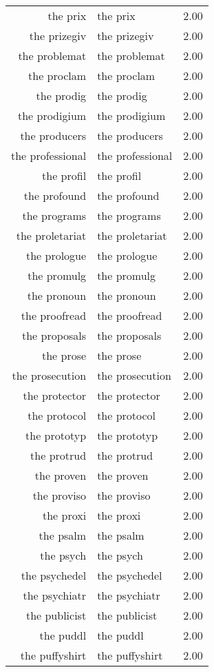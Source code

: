 \begin{table}[ht]
\begin{tabular}{rlr}
  the prix & the prix & 2.00 \\ 
  the prizegiv & the prizegiv & 2.00 \\ 
  the problemat & the problemat & 2.00 \\ 
  the proclam & the proclam & 2.00 \\ 
  the prodig & the prodig & 2.00 \\ 
  the prodigium & the prodigium & 2.00 \\ 
  the producers & the producers & 2.00 \\ 
  the professional & the professional & 2.00 \\ 
  the profil & the profil & 2.00 \\ 
  the profound & the profound & 2.00 \\ 
  the programs & the programs & 2.00 \\ 
  the proletariat & the proletariat & 2.00 \\ 
  the prologue & the prologue & 2.00 \\ 
  the promulg & the promulg & 2.00 \\ 
  the pronoun & the pronoun & 2.00 \\ 
  the proofread & the proofread & 2.00 \\ 
  the proposals & the proposals & 2.00 \\ 
  the prose & the prose & 2.00 \\ 
  the prosecution & the prosecution & 2.00 \\ 
  the protector & the protector & 2.00 \\ 
  the protocol & the protocol & 2.00 \\ 
  the prototyp & the prototyp & 2.00 \\ 
  the protrud & the protrud & 2.00 \\ 
  the proven & the proven & 2.00 \\ 
  the proviso & the proviso & 2.00 \\ 
  the proxi & the proxi & 2.00 \\ 
  the psalm & the psalm & 2.00 \\ 
  the psych & the psych & 2.00 \\ 
  the psychedel & the psychedel & 2.00 \\ 
  the psychiatr & the psychiatr & 2.00 \\ 
  the publicist & the publicist & 2.00 \\ 
  the puddl & the puddl & 2.00 \\ 
  the puffyshirt & the puffyshirt & 2.00 \\ 

\end{tabular}
\end{table}
